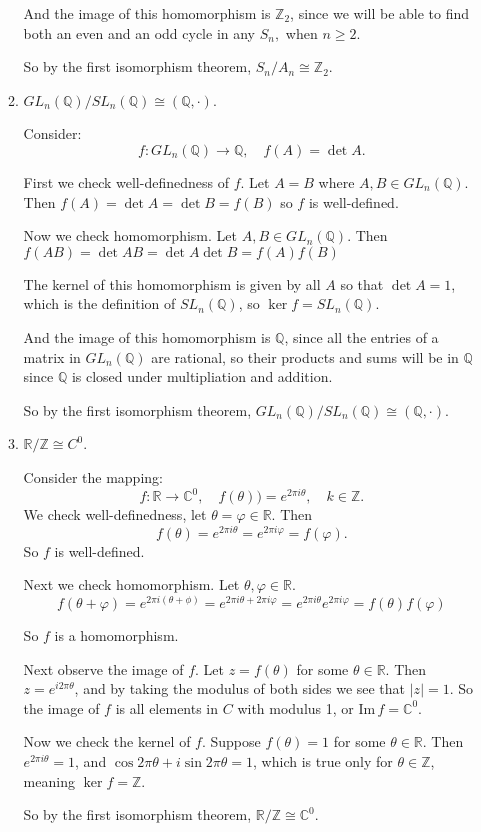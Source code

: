 \documentclass{article}
\begin{document}
\begin{enumerate}
\begin{enumerate}[label= (\alph*)]
    And the image of this homomorphism is $\mathbb{Z}_2$, since we will be able to find both an even and
    an odd cycle in any $S_n, $ when $n\ge 2$.

    So by the first isomorphism theorem, $S_n/A_n \cong \mathbb{Z}_2$.
    
\item $GL_n(\mathbb{Q})/SL_n(\mathbb{Q}) \cong (\mathbb{Q} ,  \cdot)$.

    Consider:
    \[
    f:GL_n(\mathbb{Q})\to\mathbb{Q},\quad f(A)=\det A
    .\] 

    First we check well-definedness of $f$. Let $A=B$ where $A,B\in GL_n(\mathbb{Q})$. Then
    $f(A)=\det A=\det B=f(B)$ so $f$ is well-defined.

    Now we check homomorphism. Let $A,B\in GL_n(\mathbb{Q}).$ Then 
    $f(AB)=\det AB=\det A \det B=f(A)f(B)$

    The kernel of this homomorphism is given by all $A$ so that $\det A=1$, which is the definition
    of $SL_n(\mathbb{Q})$, so $\ker f = SL_n(\mathbb{Q})$.

    And the image of this homomorphism is $\mathbb{Q}$, since all the entries of a matrix in 
    $GL_n(\mathbb{Q})$ are rational, so their products and sums will be in $\mathbb{Q}$ since
    $\mathbb{Q}$ is closed under multipliation and addition.

    So by the first isomorphism theorem, 
    $GL_n(\mathbb{Q})/SL_n(\mathbb{Q}) \cong (\mathbb{Q} ,  \cdot)$.

\item $\mathbb{R}/\mathbb{Z} \cong C^0$.

    Consider the mapping:
    \[
    f: \mathbb{R}\to\mathbb{C}^{0},\quad f(\theta))=e^{2\pi i\theta}, \quad k\in \mathbb{Z}
    .\] 
    We check well-definedness, let $\theta=\varphi\in \mathbb{R}$. Then
    \[
    f(\theta)=e^{2\pi i\theta}=e^{2\pi i\varphi}=f(\varphi)
    .\] 
    So $f$ is well-defined.

    Next we check homomorphism. Let $\theta,\varphi\in \mathbb{R}$.
    $$f(\theta+\varphi)=e^{2\pi i(\theta+\phi)}=e^{2\pi i\theta+2\pi i\varphi}=
    e^{2\pi i\theta}e^{2\pi i\varphi }=f(\theta)f(\varphi)$$

    So $f$ is a homomorphism.

    Next observe the image of $f$. Let $z=f(\theta)$ for some $\theta\in \mathbb{R}$.
    Then $z=e^{i 2\pi \theta}$, and by taking the modulus of both sides we see that 
    $|z|=1$. So the image of $f$ is all elements in $C$ with modulus 1, or 
    $\mathrm{Im}\,f=\mathbb{C}^{0}$.

    Now we check the kernel of $f$. Suppose $f(\theta)=1$ for some $\theta\in \mathbb{R}$.
    Then $e^{2\pi i\theta}=1$, and $\cos 2\pi\theta+i\sin 2\pi \theta=1$, which is true only
    for $\theta\in \mathbb{Z}$, meaning $\ker f=\mathbb{Z}$.

    So by the first isomorphism theorem, $\mathbb{R}/ \mathbb{Z}\cong \mathbb{C}^{0}$.
\end{enumerate}
\end{enumerate}
\end{document}
